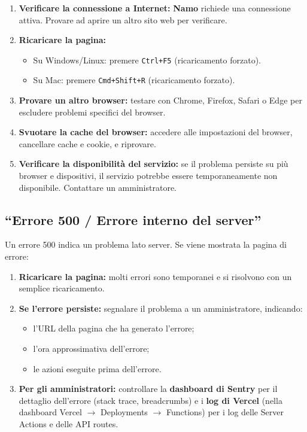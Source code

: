 \documentclass[a4paper,11pt,oneside]{book}
\newcommand{\namo}{\textbf{Namo}}
\begin{document}
\begin{enumerate}[leftmargin=1.5em]
  \item \textbf{Verificare la connessione a Internet:} \namo{} richiede una connessione attiva. Provare ad aprire un altro sito web per verificare.
  \item \textbf{Ricaricare la pagina:}
    \begin{itemize}
      \item Su Windows/Linux: premere \texttt{Ctrl+F5} (ricaricamento forzato).
      \item Su Mac: premere \texttt{Cmd+Shift+R} (ricaricamento forzato).
    \end{itemize}
  \item \textbf{Provare un altro browser:} testare con Chrome, Firefox, Safari o Edge per escludere problemi specifici del browser.
  \item \textbf{Svuotare la cache del browser:} accedere alle impostazioni del browser, cancellare cache e cookie, e riprovare.
  \item \textbf{Verificare la disponibilit\`a del servizio:} se il problema persiste su pi\`u browser e dispositivi, il servizio potrebbe essere temporaneamente non disponibile. Contattare un amministratore.
\end{enumerate}

\subsection{``Errore 500 / Errore interno del server''}

Un errore 500 indica un problema lato server. Se viene mostrata la pagina di errore:

\begin{enumerate}[leftmargin=1.5em]
  \item \textbf{Ricaricare la pagina:} molti errori sono temporanei e si risolvono con un semplice ricaricamento.
  \item \textbf{Se l'errore persiste:} segnalare il problema a un amministratore, indicando:
    \begin{itemize}
      \item l'URL della pagina che ha generato l'errore;
      \item l'ora approssimativa dell'errore;
      \item le azioni eseguite prima dell'errore.
    \end{itemize}
  \item \textbf{Per gli amministratori:} controllare la \textbf{dashboard di Sentry} per il dettaglio dell'errore (stack trace, breadcrumbs) e i \textbf{log di Vercel} (nella dashboard Vercel $\rightarrow$ Deployments $\rightarrow$ Functions) per i log delle Server Actions e delle API routes.
\end{enumerate}
\end{document}
